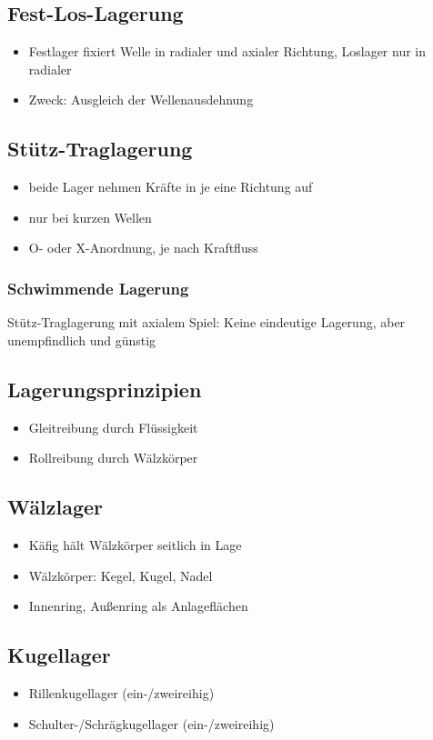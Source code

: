 \documentclass[a4paper,parskip=half*,DIV=7,fontsize=11pt]{scrartcl}
\begin{document}
\subsection{Fest-Los-Lagerung}
\begin{itemize}
	\item Festlager fixiert Welle in radialer und axialer Richtung, Loslager nur in radialer
	\item Zweck: Ausgleich der Wellenausdehnung
\end{itemize}

	
\subsection{Stütz-Traglagerung}
\begin{itemize}
	\item beide Lager nehmen Kräfte in je eine Richtung auf
	\item nur bei kurzen Wellen
	\item O- oder X-Anordnung, je nach Kraftfluss
\end{itemize}
	
\subsubsection{Schwimmende Lagerung}
Stütz-Traglagerung mit axialem Spiel:
Keine eindeutige Lagerung, aber unempfindlich und günstig
	
\subsection{Lagerungsprinzipien}
\begin{itemize}
	\item Gleitreibung durch Flüssigkeit
	\item Rollreibung durch Wälzkörper
\end{itemize}
	
\subsection{Wälzlager}
\begin{itemize}
	\item Käfig hält Wälzkörper seitlich in Lage
	\item Wälzkörper: Kegel, Kugel, Nadel
	\item Innenring, Außenring als Anlageflächen
\end{itemize}
	
\subsection{Kugellager}
\begin{itemize}
	\item Rillenkugellager (ein-/zweireihig)
	\item Schulter-/Schrägkugellager (ein-/zweireihig)		
\end{itemize}
	
\end{document}
